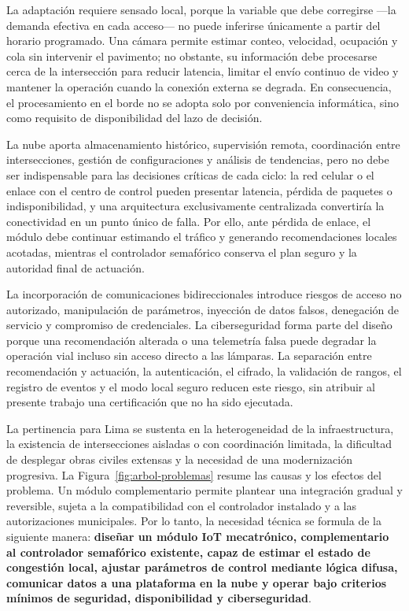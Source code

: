 La adaptación requiere sensado local, porque la variable que debe corregirse —la demanda efectiva en cada
acceso— no puede inferirse únicamente a partir del horario programado. Una cámara permite estimar conteo,
velocidad, ocupación y cola sin intervenir el pavimento; no obstante, su información debe procesarse cerca
de la intersección para reducir latencia, limitar el envío continuo de video y mantener la operación cuando
la conexión externa se degrada. En consecuencia, el procesamiento en el borde no se adopta solo por
conveniencia informática, sino como requisito de disponibilidad del lazo de decisión.

La nube aporta almacenamiento histórico, supervisión remota, coordinación entre intersecciones, gestión de
configuraciones y análisis de tendencias, pero no debe ser indispensable para las decisiones críticas de
cada ciclo: la red celular o el enlace con el centro de control pueden presentar latencia, pérdida de
paquetes o indisponibilidad, y una arquitectura exclusivamente centralizada convertiría la conectividad en
un punto único de falla. Por ello, ante pérdida de enlace, el módulo debe continuar estimando el tráfico y
generando recomendaciones locales acotadas, mientras el controlador semafórico conserva el plan seguro y la
autoridad final de actuación.

La incorporación de comunicaciones bidireccionales introduce riesgos de acceso no autorizado, manipulación
de parámetros, inyección de datos falsos, denegación de servicio y compromiso de credenciales. La
ciberseguridad forma parte del diseño porque una recomendación alterada o una telemetría falsa puede
degradar la operación vial incluso sin acceso directo a las lámparas. La separación entre recomendación y
actuación, la autenticación, el cifrado, la validación de rangos, el registro de eventos y el modo local
seguro reducen este riesgo, sin atribuir al presente trabajo una certificación que no ha sido ejecutada.

La pertinencia para Lima se sustenta en la heterogeneidad de la infraestructura, la existencia de
intersecciones aisladas o con coordinación limitada, la dificultad de desplegar obras civiles extensas y la
necesidad de una modernización progresiva. La Figura~\ref{fig:arbol-problemas} resume las causas y los
efectos del problema. Un módulo complementario permite plantear una integración gradual y reversible, sujeta
a la compatibilidad con el controlador instalado y a las autorizaciones municipales. Por lo tanto, la
necesidad técnica se formula de la siguiente manera: \textbf{diseñar un módulo IoT mecatrónico,
complementario al controlador semafórico existente, capaz de estimar el estado de congestión local, ajustar
parámetros de control mediante lógica difusa, comunicar datos a una plataforma en la nube y operar bajo
criterios mínimos de seguridad, disponibilidad y ciberseguridad}.

